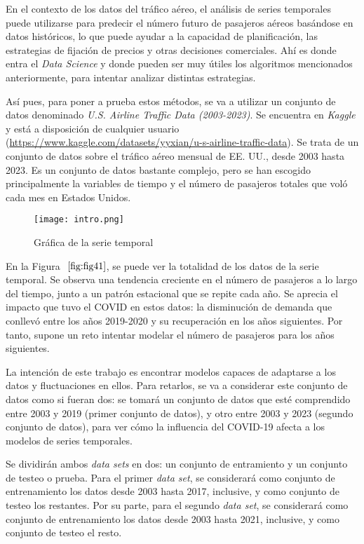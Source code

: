 \documentclass[12pt,twoside]{article}
\begin{document}
En el contexto de los datos del tráfico aéreo, el análisis de series temporales puede utilizarse para predecir el número futuro de pasajeros aéreos basándose en datos históricos, lo que puede ayudar a la capacidad de planificación, las estrategias de fijación de precios y otras decisiones comerciales. Ahí es donde entra el \textit{Data Science} y donde pueden ser muy útiles los algoritmos mencionados anteriormente, para intentar analizar distintas estrategias. 


Así pues, para poner a prueba estos métodos, se va a utilizar un conjunto de datos denominado \textit{U.S. Airline Traffic Data (2003-2023)}. Se encuentra en \textit{Kaggle} y está a disposición de cualquier usuario (\href{https://www.kaggle.com/datasets/yyxian/u-s-airline-traffic-data}{https://www.kaggle.com/datasets/yyxian/u-s-airline-traffic-data}). Se trata de un conjunto de datos sobre el tráfico aéreo mensual de EE. UU., desde 2003 hasta 2023. Es un conjunto de datos bastante complejo, pero se han escogido principalmente la variables de tiempo y el número de pasajeros totales que voló cada mes en Estados Unidos.

\begin{figure}[h]
    \centering    \texttt{[image: intro.png]}
    \caption{Gráfica de la serie temporal}
    \label{fig:fig41}
\end{figure}

En la Figura $~\ref{fig:fig41}$, se puede ver la totalidad de los datos de la serie temporal. Se observa una tendencia creciente en el número de pasajeros a lo largo del tiempo, junto a un patrón estacional que se repite cada año. Se aprecia el impacto que tuvo el COVID en estos datos: la disminución de demanda que conllevó entre los años 2019-2020 y su recuperación en los años siguientes. Por tanto, supone un reto intentar modelar el número de pasajeros para los años siguientes.

La intención de este trabajo es encontrar modelos capaces de adaptarse a los datos y fluctuaciones en ellos. Para retarlos, se va a considerar este conjunto de datos como si fueran dos: se tomará un conjunto de datos que esté comprendido entre 2003 y 2019 (primer conjunto de datos), y otro entre 2003 y 2023 (segundo conjunto de datos), para ver cómo la influencia del COVID-19 afecta a los modelos de series temporales. 

Se dividirán ambos \textit{data sets} en dos: un conjunto de entramiento y un conjunto de testeo o prueba. Para el primer \textit{data set}, se considerará como conjunto de entrenamiento los datos desde 2003 hasta 2017, inclusive, y como conjunto de testeo los restantes. Por su parte, para el segundo \textit{data set}, se considerará como conjunto de entrenamiento los datos desde 2003 hasta 2021, inclusive, y como conjunto de testeo el resto. 
\end{document}
